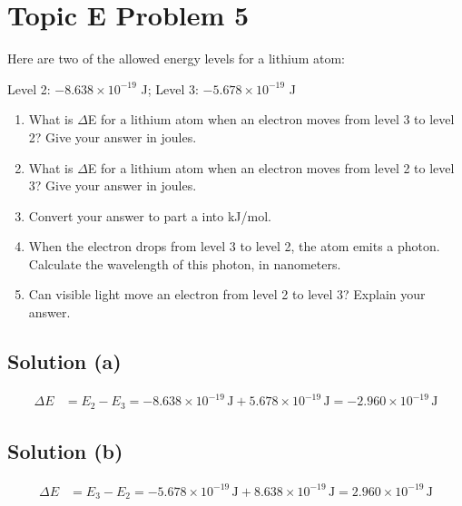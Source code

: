 \documentclass[10pt]{article}
\newcommand{\E}[1]{\times 10^{#1}}
\begin{document}
    \section{Topic E Problem 5}
        Here are two of the allowed energy levels for a lithium atom:
        \begin{center}
            Level 2: $-8.638\E{-19}$ J; Level 3: $-5.678\E{-19}$ J
        \end{center}
        \begin{enumerate}[label=\alph*)]
            \item   What is $\Delta$E for a lithium atom when an electron moves from level 3 to level 2? 
                Give your answer in joules.
            \item   What is $\Delta$E for a lithium atom when an electron moves from level 2 to level 3? 
                Give your answer in joules.
            \item   Convert your answer to part a into kJ/mol.
            \item   When the electron drops from level 3 to level 2, the atom emits a photon. 
                Calculate the wavelength of this photon, in nanometers.
            \item   Can visible light move an electron from level 2 to level 3? 
                Explain your answer.
        \end{enumerate}

        \subsection{Solution (a)}
            \begin{align*}
                \Delta E    &=  E_2 - E_3
                    =   -8.638\E{-19}\,\unit{\joule} + 5.678\E{-19}\,\unit{\joule}
                    =   \boxed{-2.960\E{-19}\,\unit{\joule}}
            \end{align*}
        
        \subsection{Solution (b)}
            \begin{align*}
                \Delta E    &=  E_3 - E_2
                    =   -5.678\E{-19}\,\unit{\joule} + 8.638\E{-19}\,\unit{\joule}
                    =   \boxed{2.960\E{-19}\,\unit{\joule}}
            \end{align*}
\end{document}
